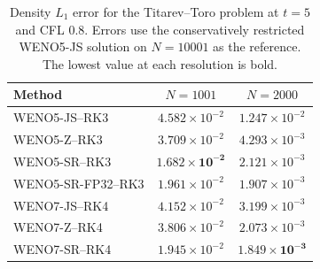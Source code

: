\begin{table}[H]
\centering
\caption{Density $L_1$ error for the Titarev--Toro problem at $t=5$ and CFL
$0.8$.  Errors use the conservatively restricted WENO5-JS solution on
$N=10001$ as the reference.  The lowest value at each resolution is bold.}
\label{tab:titarev_toro_l1_weno_z}
\small
\setlength{\tabcolsep}{7pt}
\begin{tabular}{lcc}
\toprule
Method & $N=1001$ & $N=2000$ \\
\midrule
WENO5-JS--RK3      & $4.582\times10^{-2}$ & $1.247\times10^{-2}$ \\
WENO5-Z--RK3       & $3.709\times10^{-2}$ & $4.293\times10^{-3}$ \\
WENO5-SR--RK3      & $\mathbf{1.682\times10^{-2}}$ & $2.121\times10^{-3}$ \\
WENO5-SR-FP32--RK3 & $1.961\times10^{-2}$ & $1.907\times10^{-3}$ \\
WENO7-JS--RK4      & $4.152\times10^{-2}$ & $3.199\times10^{-3}$ \\
WENO7-Z--RK4       & $3.806\times10^{-2}$ & $2.073\times10^{-3}$ \\
WENO7-SR--RK4      & $1.945\times10^{-2}$ & $\mathbf{1.849\times10^{-3}}$ \\
\bottomrule
\end{tabular}
\end{table}
